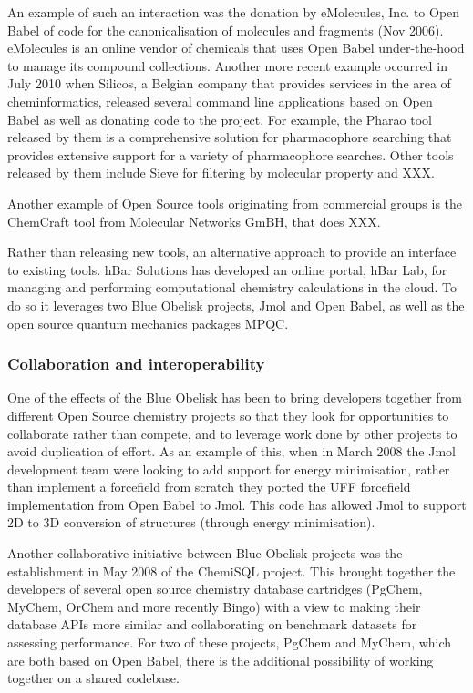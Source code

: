 \documentclass[10pt]{bmc_article}
\newenvironment{bmcformat}{\begin{raggedright}\baselineskip20pt\sloppy\setboolean{publ}{false}}{\end{raggedright}\baselineskip20pt\sloppy}
\begin{document}
\begin{bmcformat}
An example of such an interaction was the donation by eMolecules, Inc. to Open Babel of code for the canonicalisation of molecules and fragments (Nov 2006). eMolecules is an online vendor of chemicals that uses Open Babel under-the-hood to manage its compound collections. Another more recent example occurred in July 2010 when Silicos, a Belgian company that provides services
in the area of cheminformatics, released several command line applications based on Open Babel as well as donating code to the project. For example, the Pharao
tool released by them is a comprehensive solution for pharmacophore
searching that provides extensive support for a variety of
pharmacophore searches. Other tools released by them include Sieve for
filtering by molecular property and XXX.

Another example of Open Source
tools originating from commercial groups is the ChemCraft tool from
Molecular Networks GmBH, that does XXX.

Rather than releasing new tools, an alternative approach to provide an interface to existing tools. hBar Solutions has developed an online portal, hBar Lab, for managing and performing computational chemistry calculations in the cloud. To do so it leverages two Blue Obelisk projects, Jmol and Open Babel, as well as the open source quantum mechanics packages MPQC.

  \subsubsection*{Collaboration and interoperability}

One of the effects of the Blue Obelisk has been to bring developers together from different Open Source chemistry projects so that they look for opportunities to collaborate rather than compete, and to leverage work done by other projects to avoid duplication of effort. As an example of this, when in March 2008 the Jmol development team were looking to add support for energy minimisation, rather than implement a forcefield from scratch they ported the UFF forcefield implementation from Open Babel to Jmol. This code has allowed Jmol to support 2D to 3D conversion of structures (through energy minimisation).

Another collaborative initiative between Blue Obelisk projects was the establishment in May 2008 of
the ChemiSQL project. This brought together the developers of several
open source chemistry database cartridges (PgChem, MyChem, OrChem and
more recently Bingo) with a view to making their database APIs more
similar and collaborating on benchmark datasets for assessing
performance. For two of these projects, PgChem and MyChem, which are both based on
Open Babel, there is the additional possibility of working together on a shared
codebase.


\end{bmcformat}
\end{document}
